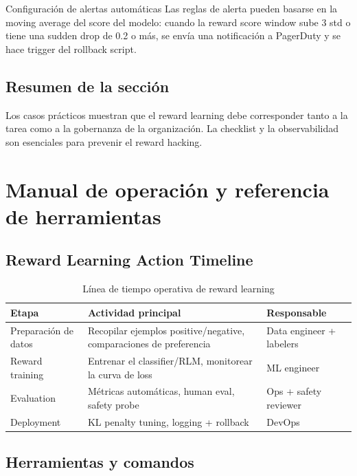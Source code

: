 \documentclass[a4paper]{article}
\begin{document}
\begin{importantbox}{Configuración de alertas automáticas}
Las reglas de alerta pueden basarse en la moving average del score del modelo: cuando la reward score window sube 3 std o tiene una sudden drop de 0.2 o más, se envía una notificación a PagerDuty y se hace trigger del rollback script.
\end{importantbox}

\subsection{Resumen de la sección}

Los casos prácticos muestran que el reward learning debe corresponder tanto a la tarea como a la gobernanza de la organización. La checklist y la observabilidad son esenciales para prevenir el reward hacking.
\section{Manual de operación y referencia de herramientas}

\subsection{Reward Learning Action Timeline}

\begin{table}[H]
\centering
\begin{tabular}{p{} p{} p{}}
\toprule
Etapa & Actividad principal & Responsable \\
\midrule
Preparación de datos & Recopilar ejemplos positive/negative, comparaciones de preferencia & Data engineer + labelers \\
Reward training & Entrenar el classifier/RLM, monitorear la curva de loss & ML engineer \\
Evaluation & Métricas automáticas, human eval, safety probe & Ops + safety reviewer \\
Deployment & KL penalty tuning, logging + rollback & DevOps \\
\bottomrule
\end{tabular}
\caption{Línea de tiempo operativa de reward learning}
\end{table}

\subsection{Herramientas y comandos}
\end{document}
